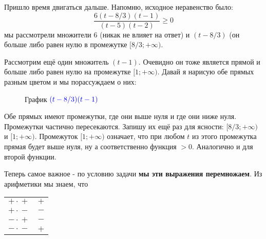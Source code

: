 \documentclass{article}
\begin{document}
Пришло время двигаться дальше. Напомню, исходное неравенство было:
$$\frac{6(t-8/3)(t-1)}{(t-5)(t-2)}\ge{}0$$
мы рассмотрели множители $6$ (никак не влияет на ответ) и $(t-8/3)$ (он больше либо равен нулю в промежутке $[8/3;+\infty)$.

Рассмотрим ещё один множитель $(t-1)$. Очевидно он тоже является прямой и больше либо равен нулю на промежутке $[1;+\infty)$. Давай я нарисую обе прямых разным цветом и мы порассуждаем о них:

\begin{figure}[H]
\centering
{}
\caption{График $\color{blue}(t-8/3)(t-1)$}
\label{fig:f3}
\end{figure}

Обе прямых имеют промежутки, где они выше нуля и где они ниже нуля. Промежутки частично пересекаются. Запишу их ещё раз для ясности: $[8/3;+\infty)$ и $[1;+\infty)$. Промежуток $[1;+\infty)$ означает, что при любом $t$ из этого промежутка прямая будет выше нуля, ну а соответственно функция  $> 0$. Аналогично и для второй функции.

Теперь самое важное - по условию задачи \textbf{мы эти выражения перемножаем}. Из арифметики мы знаем, что

\begin{tabular}{|c|c|}
\hline
     $+\cdot{}+$ & $+$ \\
     $+\cdot{}-$ & $-$ \\
     $-\cdot{}+$ & $-$ \\
     $-\cdot{}-$ & $+$ \\
\hline
\end{tabular}
\end{document}
